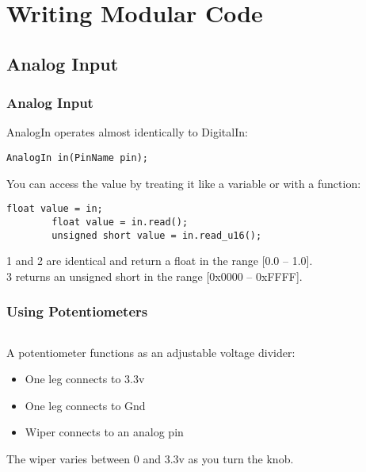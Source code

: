 \section{Writing Modular Code}
\label{sec:modular_code}

\subsection{Analog Input}
\label{sub:analog_input}
\begin{frame}[fragile]
	\frametitle{Analog Input}
	AnalogIn operates almost identically to DigitalIn:
	\begin{lstlisting}[numbers=none]
		AnalogIn in(PinName pin);
	\end{lstlisting}
	\vfill
	You can access the value by treating it like a variable or with a function:
	\begin{lstlisting}[]
		float value = in;
		float value = in.read();
		unsigned short value = in.read_u16();
	\end{lstlisting}
	1 and 2 are identical and return a float in the range [0.0 -- 1.0].\\
	3 returns an unsigned short in the range [0x0000 -- 0xFFFF].
\end{frame}

\begin{frame}
	\frametitle{Using Potentiometers}
	\begin{columns}[T]
		\begin{column}{0.5\textwidth}
			A potentiometer functions as an adjustable voltage divider:
			\begin{itemize}
				\item One leg connects to 3.3v
				\item One leg connects to Gnd
				\item Wiper connects to an analog pin
			\end{itemize}
			The wiper varies between 0 and 3.3v as you turn the knob.
		\end{column}
		\begin{column}{0.5\textwidth}
		\end{column}
	\end{columns}
\end{frame}

